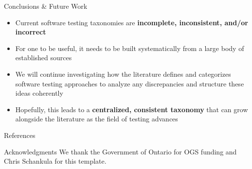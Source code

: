 \documentclass[22pt]{beamer}
\begin{document}
\begin{frame}[fragile]
\begin{textblock}{7.25}
        \begin{block}{\fontsize{37}{20}\selectfont Conclusions \& Future Work}
            \begin{itemize}
                \item Current software testing taxonomies are \textbf{incomplete,
                          inconsistent, and/or incorrect}
                \item For one to be useful, it needs to be built systematically
                      from a large body of established sources
                \item We will continue investigating how the literature defines
                      and categorizes software testing approaches to analyze any
                      discrepancies and structure these ideas coherently
                \item Hopefully, this leads to a \textbf{centralized, consistent
                          taxonomy} that can grow alongside the literature as the
                      field of testing advances
            \end{itemize}
            \vspace{5mm}
        \end{block}

        \begin{block}{\fontsize{37}{20}\selectfont References}
            
            {\fontsize{23}{11}\selectfont
                }
            \vspace{5mm}
        \end{block}

        \begin{block}{\fontsize{37}{20}\selectfont Acknowledgments}
            We thank the Government of Ontario for OGS funding and Chris
            Schankula for this template.
            \vspace{5mm}
        \end{block}
    \end{textblock}

\end{frame}
\end{document}
